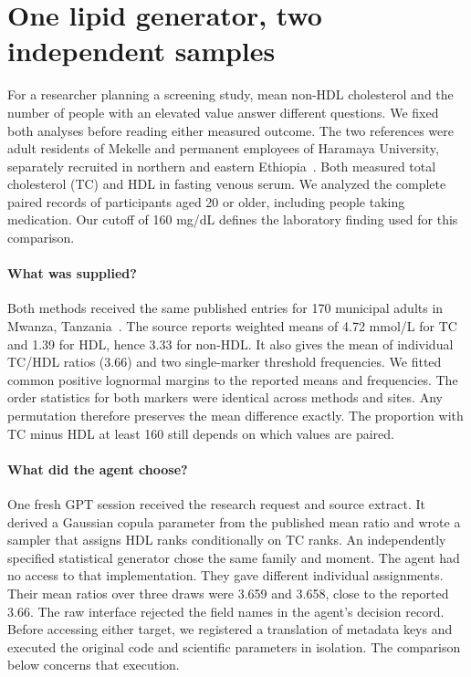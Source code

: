 \documentclass[sigconf,anonymous,review]{acmart}
\begin{document}
\section{One lipid generator, two independent samples}
\label{sec:nonhdl}
For a researcher planning a screening study, mean non-HDL cholesterol and the number of people with an elevated value answer different questions. We fixed both analyses before reading either measured outcome. The two references were adult residents of Mekelle and permanent employees of Haramaya University, separately recruited in northern and eastern Ethiopia~\cite{mekelle,haramaya}. Both measured total cholesterol (TC) and HDL in fasting venous serum. We analyzed the complete paired records of participants aged 20 or older, including people taking medication. Our cutoff of 160 mg/dL defines the laboratory finding used for this comparison.

\paragraph{What was supplied?}
Both methods received the same published entries for 170 municipal adults in Mwanza, Tanzania~\cite{kavishe}. The source reports weighted means of 4.72 mmol/L for TC and 1.39 for HDL, hence 3.33 for non-HDL. It also gives the mean of individual TC/HDL ratios (3.66) and two single-marker threshold frequencies. We fitted common positive lognormal margins to the reported means and frequencies. The order statistics for both markers were identical across methods and sites. Any permutation therefore preserves the mean difference exactly. The proportion with TC minus HDL at least 160 still depends on which values are paired.

\paragraph{What did the agent choose?}
One fresh GPT session received the research request and source extract. It derived a Gaussian copula parameter from the published mean ratio and wrote a sampler that assigns HDL ranks conditionally on TC ranks. An independently specified statistical generator chose the same family and moment. The agent had no access to that implementation. They gave different individual assignments. Their mean ratios over three draws were 3.659 and 3.658, close to the reported 3.66. The raw interface rejected the field names in the agent's decision record. Before accessing either target, we registered a translation of metadata keys and executed the original code and scientific parameters in isolation. The comparison below concerns that execution.
\end{document}
